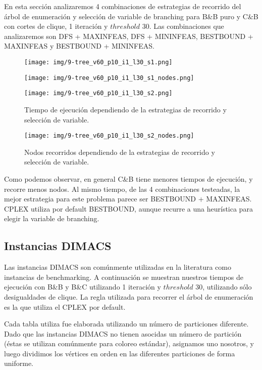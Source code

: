 En esta sección analizaremos 4 combinaciones de estrategias de recorrido del árbol de enumeración y selección de variable de branching para B\&B puro y C\&B con cortes de clique, 1 iteración y $threshold$ 30. Las combinaciones que analizaremos son DFS + MAXINFEAS, DFS + MININFEAS, BESTBOUND + MAXINFEAS y BESTBOUND + MININFEAS.

\begin{figure}[h]
  \centering
  \begin{minipage}[b]{0.49\textwidth}
    \texttt{[image: img/9-tree\_v60\_p10\_i1\_l30\_s1.png]}
  \end{minipage}
  \hfill
  \begin{minipage}[b]{0.49\textwidth}
    \texttt{[image: img/9-tree\_v60\_p10\_i1\_l30\_s1\_nodes.png]}
  \end{minipage}
  \begin{minipage}[b]{0.49\textwidth}
    \texttt{[image: img/9-tree\_v60\_p10\_i1\_l30\_s2.png]}
  \caption{Tiempo de ejecución dependiendo de la estrategias de recorrido y selección de variable.}
  \end{minipage}
  \hfill
  \begin{minipage}[b]{0.49\textwidth}
    \texttt{[image: img/9-tree\_v60\_p10\_i1\_l30\_s2\_nodes.png]}
  \caption{Nodos recorridos dependiendo de la estrategias de recorrido y selección de variable.}
  \end{minipage}
\end{figure}

Como podemos observar, en general C\&B tiene menores tiempos de ejecución, y recorre menos nodos. Al mismo tiempo, de las 4 combinaciones testeadas, la mejor estrategia para este problema parece ser BESTBOUND + MAXINFEAS. CPLEX utiliza por default BESTBOUND, aunque recurre a una heurística para elegir la variable de branching. 

\subsection{Instancias DIMACS}

Las instancias DIMACS son comúnmente utilizadas en la literatura como instancias de benchmarking. A continuación se muestran nuestros tiempos de ejecución con B\&B y B\&C utilizando 1 iteración y $threshold$ 30, utilizando sólo desigualdades de clique. La regla utilizada para recorrer el árbol de enumeración es la que utiliza el CPLEX por default.

Cada tabla utiliza fue elaborada utilizando un número de particiones diferente. Dado que las instancias DIMACS no tienen asocidas un número de partición (éstas se utilizan comúnmente para coloreo estándar), asignamos uno nosotros, y luego dividimos los vértices en orden en las diferentes particiones de forma uniforme.

